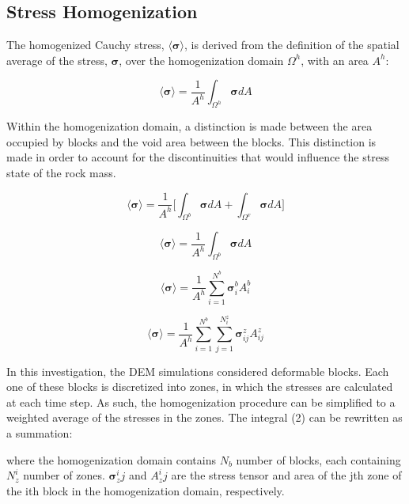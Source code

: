 \subsection{Stress Homogenization}
The homogenized Cauchy stress, $\langle \boldsymbol{\sigma} \rangle$, is derived from the definition of the spatial average of the stress, $\boldsymbol{\sigma}$, over the homogenization domain $\Omega^h$, with an area $A^h$:

\begin{equation}
\label{eqn:stress1}
\langle \boldsymbol{\sigma} \rangle = \frac{1}{A^h} \int_{\Omega^h} \boldsymbol{\sigma} {dA}
\end{equation}

Within the homogenization domain, a distinction is made between the area occupied by blocks and the void area between the blocks. This distinction is made in order to account for the discontinuities that would influence the stress state of the rock mass. 

\begin{equation}
\label{eqn:stress2}
\langle \boldsymbol{\sigma} \rangle = 
\frac{1}{A^h} \bigg \lbrack {\int_{\Omega^{b}} \boldsymbol{\sigma} {dA} + 
\int_{\Omega^{v}} \boldsymbol{\sigma} {dA}} \bigg \rbrack
\end{equation}

\begin{equation}
\label{eqn:stress2a}
\langle \boldsymbol{\sigma} \rangle = 
\frac{1}{A^h} \int_{\Omega^{b}} \boldsymbol{\sigma} {dA}
\end{equation}

\begin{equation}
\label{eqn:stress3}
\langle \boldsymbol{\sigma} \rangle = 
\frac{1}{A^h} \sum_{i=1}^{N^{b}} \boldsymbol{\sigma}_{i}^b A^{b}_{i} 
\end{equation}

\begin{equation}
\label{eqn:stress4}
\langle \boldsymbol{\sigma} \rangle = 
\frac{1}{A^h} \sum_{i=1}^{N^{b}} \sum_{j=1}^{N^{z}_i} \boldsymbol{\sigma}^z_{ij} A^{z}_{ij} 
\end{equation}


In this investigation, the DEM simulations considered deformable blocks. Each one of these blocks is discretized into zones, in which the stresses are calculated at each time step. As such, the homogenization procedure can be simplified to a weighted average of the stresses in the zones. The integral (2) can be rewritten as a summation: 


	
where the homogenization domain contains $N_b$ number of blocks, each containing $N_z^i$ number of zones. $\boldsymbol{\sigma}_z^ij$ and $A_z^ij$ are the stress tensor and area of the jth zone of the ith block in the homogenization domain, respectively.